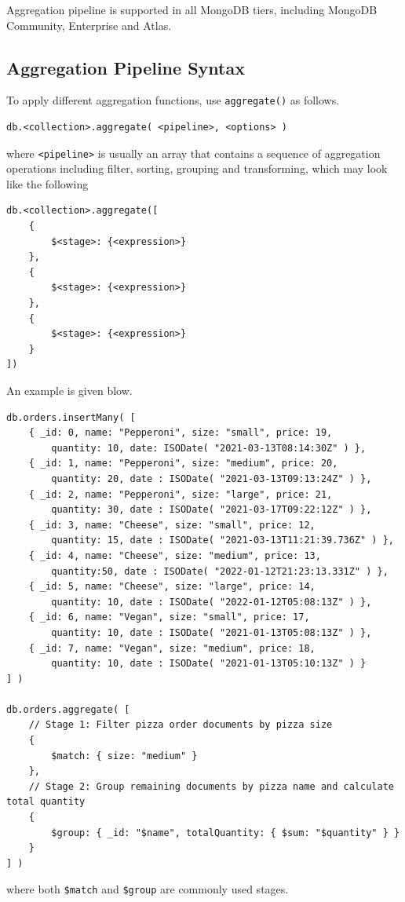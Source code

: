 Aggregation pipeline is supported in all MongoDB tiers, including MongoDB Community, Enterprise and Atlas.

\subsection{Aggregation Pipeline Syntax}

To apply different aggregation functions, use \verb|aggregate()| as follows.
\begin{lstlisting}
db.<collection>.aggregate( <pipeline>, <options> )
\end{lstlisting}
where \verb|<pipeline>| is usually an array that contains a sequence of aggregation operations including filter, sorting, grouping and transforming, which may look like the following
\begin{lstlisting}
db.<collection>.aggregate([
	{
		$<stage>: {<expression>}
	},
	{
		$<stage>: {<expression>}
	},
	{
		$<stage>: {<expression>}
	}
])
\end{lstlisting}

An example is given blow.
\begin{lstlisting}
db.orders.insertMany( [
	{ _id: 0, name: "Pepperoni", size: "small", price: 19,
		quantity: 10, date: ISODate( "2021-03-13T08:14:30Z" ) },
	{ _id: 1, name: "Pepperoni", size: "medium", price: 20,
		quantity: 20, date : ISODate( "2021-03-13T09:13:24Z" ) },
	{ _id: 2, name: "Pepperoni", size: "large", price: 21,
		quantity: 30, date : ISODate( "2021-03-17T09:22:12Z" ) },
	{ _id: 3, name: "Cheese", size: "small", price: 12,
		quantity: 15, date : ISODate( "2021-03-13T11:21:39.736Z" ) },
	{ _id: 4, name: "Cheese", size: "medium", price: 13,
		quantity:50, date : ISODate( "2022-01-12T21:23:13.331Z" ) },
	{ _id: 5, name: "Cheese", size: "large", price: 14,
		quantity: 10, date : ISODate( "2022-01-12T05:08:13Z" ) },
	{ _id: 6, name: "Vegan", size: "small", price: 17,
		quantity: 10, date : ISODate( "2021-01-13T05:08:13Z" ) },
	{ _id: 7, name: "Vegan", size: "medium", price: 18,
		quantity: 10, date : ISODate( "2021-01-13T05:10:13Z" ) }
] )
	
db.orders.aggregate( [
	// Stage 1: Filter pizza order documents by pizza size
	{
		$match: { size: "medium" }
	},
	// Stage 2: Group remaining documents by pizza name and calculate total quantity
	{
		$group: { _id: "$name", totalQuantity: { $sum: "$quantity" } }
	}
] )
\end{lstlisting}
where both \verb|$match| and \verb|$group| are commonly used stages.

